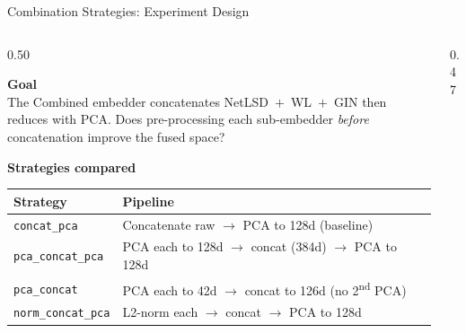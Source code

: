 \documentclass[aspectratio=169,10pt]{beamer}
\begin{document}
\begin{frame}[fragile]{Combination Strategies: Experiment Design}
\begin{columns}[T]
\begin{column}{0.50\textwidth}

  \textbf{Goal}\\[3pt]
  {\small The Combined embedder concatenates NetLSD~$+$~WL~$+$~GIN
  then reduces with PCA\@.  Does pre-processing each sub-embedder
  \emph{before} concatenation improve the fused space?}

  \vspace{0.6em}
  \textbf{Strategies compared}

  \vspace{0.2em}
  {\scriptsize
  \renewcommand{\arraystretch}{1.25}
  \begin{tabular}{p{2.2cm}p{4.8cm}}
    \toprule
    \textbf{Strategy} & \textbf{Pipeline} \\
    \midrule
    \texttt{concat\_pca}
      & Concatenate raw $\to$ PCA to 128d {\small(baseline)} \\
    \texttt{pca\_concat\_pca}
      & PCA each to 128d $\to$ concat (384d) $\to$ PCA to 128d \\
    \texttt{pca\_concat}
      & PCA each to 42d $\to$ concat to 126d {\small(no 2\textsuperscript{nd} PCA)} \\
    \texttt{norm\_concat\_pca}
      & L2-norm each $\to$ concat $\to$ PCA to 128d \\
    \bottomrule
  \end{tabular}}


\end{column}
\begin{column}{0.47\textwidth}

  \centering
  \vspace{0.5em}


\end{column}
\end{columns}
\end{frame}
\end{document}
